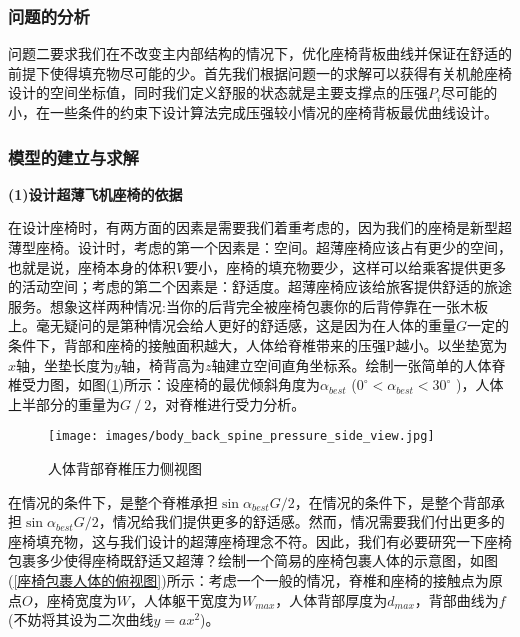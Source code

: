         \subsubsection{问题的分析}
            \par
            问题二要求我们在不改变主内部结构的情况下，优化座椅背板曲线并保证在舒适的前提下使得填充物尽可能的少。首先我们根据问题一的求解可以获得有关机舱座椅设计的空间坐标值，同时我们定义舒服的状态就是主要支撑点的压强$P_i$尽可能的小，在一些条件的约束下设计算法完成压强较小情况的座椅背板最优曲线设计。
        \subsubsection{模型的建立与求解}
            \par
            \textbf{(1)设计超薄飞机座椅的依据}
            \par
            在设计座椅时，有两方面的因素是需要我们着重考虑的，因为我们的座椅是新型超薄型座椅。设计时，考虑的第一个因素是：空间。超薄座椅应该占有更少的空间，也就是说，座椅本身的体积$V$要小，座椅的填充物要少，这样可以给乘客提供更多的活动空间；考虑的第二个因素是：舒适度。超薄座椅应该给旅客提供舒适的旅途服务。想象这样两种情况:当你的后背完全被座椅包裹你的后背停靠在一张木板上。毫无疑问的是第种情况会给人更好的舒适感，这是因为在人体的重量$G$一定的条件下，背部和座椅的接触面积越大，人体给脊椎带来的压强P越小。以坐垫宽为$x$轴，坐垫长度为$y$轴，椅背高为$z$轴建立空间直角坐标系。绘制一张简单的人体脊椎受力图，如图(\ref{人体背部脊椎压力侧视图})所示：设座椅的最优倾斜角度为$\alpha_{best}$ ($0^\circ<\alpha_{best}<30^\circ$ )，人体上半部分的重量为$G⁄2$，对脊椎进行受力分析。
            \begin{figure}[H]
            \centering
            \texttt{[image: images/body\_back\_spine\_pressure\_side\_view.jpg]}
            \caption{人体背部脊椎压力侧视图}
            \label{人体背部脊椎压力侧视图}
            \end{figure}
            \par
            在情况的条件下，是整个脊椎承担$\sin \alpha_{best}G/2$，在情况的条件下，是整个背部承担$\sin \alpha_{best}G/2$，情况给我们提供更多的舒适感。然而，情况需要我们付出更多的座椅填充物，这与我们设计的超薄座椅理念不符。因此，我们有必要研究一下座椅包裹多少使得座椅既舒适又超薄？绘制一个简易的座椅包裹人体的示意图，如图(\ref{座椅包裹人体的俯视图})所示：考虑一个一般的情况，脊椎和座椅的接触点为原点$O$，座椅宽度为$W$，人体躯干宽度为$W_{max}$，人体背部厚度为$d_{max}$，背部曲线为$f$(不妨将其设为二次曲线$y=ax^2$)。
